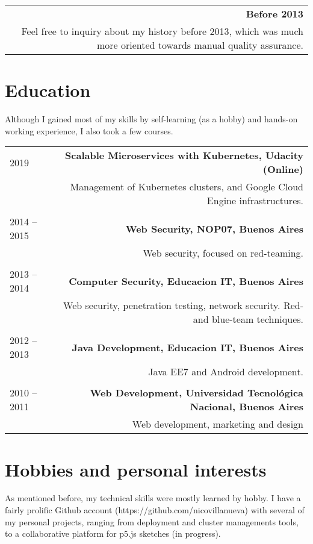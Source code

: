 \documentclass{vitae}
\begin{document}
\begin{tabular}{L!{\VRule}R}
\\
&{\bf Before 2013}\\
&Feel free to inquiry about my history before 2013, which was much more oriented towards manual quality assurance.
\end{tabular}

\section*{Education}
Although I gained most of my skills by self-learning (as a hobby) and hands-on working experience, I also took a few courses.

\begin{tabular}{L!{\VRule}R}
2019&{\bf Scalable Microservices with Kubernetes, Udacity (Online)}\\
&Management of Kubernetes clusters, and Google Cloud Engine infrastructures.\\
\\
2014 -- 2015&{\bf Web Security, NOP07, Buenos Aires}\\
&Web security, focused on red-teaming.\\
\\
2013 -- 2014&{\bf Computer Security, Educacion IT, Buenos Aires}\\
&Web security, penetration testing, network security. Red- and blue-team techniques.\\
\\
2012 -- 2013&{\bf Java Development, Educacion IT, Buenos Aires}\\
&Java EE7 and Android development.\\
\\
2010 -- 2011&{\bf Web Development, Universidad Tecnológica Nacional, Buenos Aires}\\
&Web development, marketing and design\\

\end{tabular}

\section*{Hobbies and personal interests}
As mentioned before, my technical skills were mostly learned by hobby. I have a fairly prolific Github account (https://github.com/nicovillanueva) with several of my personal projects, ranging from deployment and cluster managements tools, to a collaborative platform for p5.js sketches (in progress).
\end{document}
